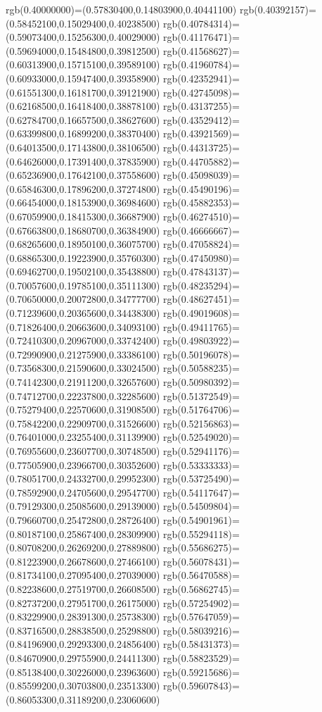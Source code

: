 {{rgb(0.40000000)=(0.57830400,0.14803900,0.40441100)
rgb(0.40392157)=(0.58452100,0.15029400,0.40238500)
rgb(0.40784314)=(0.59073400,0.15256300,0.40029000)
rgb(0.41176471)=(0.59694000,0.15484800,0.39812500)
rgb(0.41568627)=(0.60313900,0.15715100,0.39589100)
rgb(0.41960784)=(0.60933000,0.15947400,0.39358900)
rgb(0.42352941)=(0.61551300,0.16181700,0.39121900)
rgb(0.42745098)=(0.62168500,0.16418400,0.38878100)
rgb(0.43137255)=(0.62784700,0.16657500,0.38627600)
rgb(0.43529412)=(0.63399800,0.16899200,0.38370400)
rgb(0.43921569)=(0.64013500,0.17143800,0.38106500)
rgb(0.44313725)=(0.64626000,0.17391400,0.37835900)
rgb(0.44705882)=(0.65236900,0.17642100,0.37558600)
rgb(0.45098039)=(0.65846300,0.17896200,0.37274800)
rgb(0.45490196)=(0.66454000,0.18153900,0.36984600)
rgb(0.45882353)=(0.67059900,0.18415300,0.36687900)
rgb(0.46274510)=(0.67663800,0.18680700,0.36384900)
rgb(0.46666667)=(0.68265600,0.18950100,0.36075700)
rgb(0.47058824)=(0.68865300,0.19223900,0.35760300)
rgb(0.47450980)=(0.69462700,0.19502100,0.35438800)
rgb(0.47843137)=(0.70057600,0.19785100,0.35111300)
rgb(0.48235294)=(0.70650000,0.20072800,0.34777700)
rgb(0.48627451)=(0.71239600,0.20365600,0.34438300)
rgb(0.49019608)=(0.71826400,0.20663600,0.34093100)
rgb(0.49411765)=(0.72410300,0.20967000,0.33742400)
rgb(0.49803922)=(0.72990900,0.21275900,0.33386100)
rgb(0.50196078)=(0.73568300,0.21590600,0.33024500)
rgb(0.50588235)=(0.74142300,0.21911200,0.32657600)
rgb(0.50980392)=(0.74712700,0.22237800,0.32285600)
rgb(0.51372549)=(0.75279400,0.22570600,0.31908500)
rgb(0.51764706)=(0.75842200,0.22909700,0.31526600)
rgb(0.52156863)=(0.76401000,0.23255400,0.31139900)
rgb(0.52549020)=(0.76955600,0.23607700,0.30748500)
rgb(0.52941176)=(0.77505900,0.23966700,0.30352600)
rgb(0.53333333)=(0.78051700,0.24332700,0.29952300)
rgb(0.53725490)=(0.78592900,0.24705600,0.29547700)
rgb(0.54117647)=(0.79129300,0.25085600,0.29139000)
rgb(0.54509804)=(0.79660700,0.25472800,0.28726400)
rgb(0.54901961)=(0.80187100,0.25867400,0.28309900)
rgb(0.55294118)=(0.80708200,0.26269200,0.27889800)
rgb(0.55686275)=(0.81223900,0.26678600,0.27466100)
rgb(0.56078431)=(0.81734100,0.27095400,0.27039000)
rgb(0.56470588)=(0.82238600,0.27519700,0.26608500)
rgb(0.56862745)=(0.82737200,0.27951700,0.26175000)
rgb(0.57254902)=(0.83229900,0.28391300,0.25738300)
rgb(0.57647059)=(0.83716500,0.28838500,0.25298800)
rgb(0.58039216)=(0.84196900,0.29293300,0.24856400)
rgb(0.58431373)=(0.84670900,0.29755900,0.24411300)
rgb(0.58823529)=(0.85138400,0.30226000,0.23963600)
rgb(0.59215686)=(0.85599200,0.30703800,0.23513300)
rgb(0.59607843)=(0.86053300,0.31189200,0.23060600)
}}
